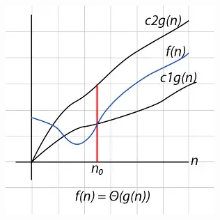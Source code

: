 \documentclass[10pt,aspectratio=43]{beamer}
\begin{document}
\begin{frame}
\begin{columns}
    \begin{column}{0.3\textwidth}
      \includegraphics[width=\textwidth]{figures/MasterTheorem/theta.jpg}
    \end{column}
  \end{columns}
\end{frame}
\end{document}
